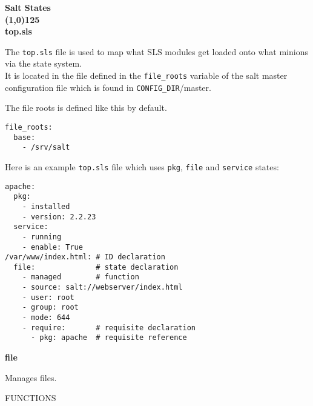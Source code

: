 \documentclass[landscape,a4paper,10pt]{article}
\begin{document}
\begin{multicols}{3}

\bfseries{\Huge{Salt States}}\\[-0.3cm]
\line(1,0){125}\\

\bfseries{\LARGE{top.sls}}

The \texttt{top.sls} file is used to map what SLS modules get loaded onto what minions via the state system.\\

It is located in the file defined in the \texttt{file_roots} variable of the
salt master configuration file which is found in
\texttt{CONFIG_DIR}/master.

The file roots is defined like this by default.
\begin{verbatim}
file_roots:
  base:
    - /srv/salt
\end{verbatim}

Here is an example \texttt{top.sls} file which uses \texttt{pkg}, \texttt{file} and \texttt{service} states:

\begin{verbatim}
apache:
  pkg:
    - installed
    - version: 2.2.23
  service:
    - running
    - enable: True
/var/www/index.html: # ID declaration
  file:              # state declaration
    - managed        # function
    - source: salt://webserver/index.html
    - user: root
    - group: root
    - mode: 644
    - require:       # requisite declaration
      - pkg: apache  # requisite reference
\end{verbatim}


\bfseries{\LARGE{file}}

Manages files.

FUNCTIONS



\end{multicols}
\end{document}
